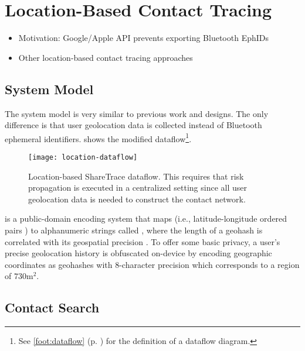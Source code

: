 \section{Location-Based Contact Tracing}\label{sec:location-based}
	\begin{itemize}
	\item Motivation: Google/Apple API prevents exporting Bluetooth EphIDs
	\item Other location-based contact tracing approaches
	\end{itemize}
\subsection{System Model}
The system model is very similar to previous work \cite{Ayday2020, Ayday2021} and designs. The only difference is that user geolocation data is collected instead of Bluetooth ephemeral identifiers.  shows the modified dataflow\footnote{See \cref{foot:dataflow} (p. ) for the definition of a dataflow diagram.}.
	\begin{figure}[ht!]
		\texttt{[image: location-dataflow]}
		\caption[Geolocation-based ShareTrace dataflow]{Location-based ShareTrace dataflow. This requires that risk propagation is executed in a centralized setting since all user geolocation data is needed to construct the contact network.}
		\label{fig:location-based}
	\end{figure}
 is a public-domain encoding system that maps  (i.e., latitude-longitude ordered pairs \cite[p. 5]{Sickle2004}) to alphanumeric strings called , where the length of a geohash is correlated with its geospatial precision \cite{Morton1966}. To offer some basic privacy, a user's precise geolocation history is obfuscated on-device by encoding geographic coordinates as geohashes with 8-character precision which corresponds to a region of $730\mathrm{m}^2$.

\subsection{Contact Search}

\newcommand{\histories}{\mathcal{H}}
\newcommand{\locations}{\mathbb{L}}
\newcommand{\locset}{\mathcal{L}}
\newcommand{\latitude}{\phi}
\newcommand{\longitude}{\lambda}
\newcommand{\users}{\mathcal{U}}
\newcommand{\sindex}{\mathcal{I}}
\newcommand{\query}{\mathcal{N}}
\newcommand{\qelement}{q}
\newcommand{\hone}{G}
\newcommand{\htwo}{H}
\newcommand{\neighbors}{N}

